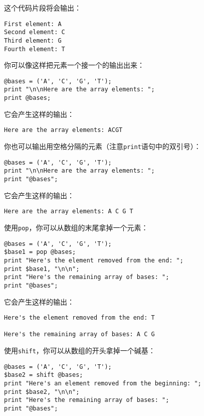 这个代码片段将会输出：

\begin{lstlisting}
First element: A
Second element: C
Third element: G
Fourth element: T
\end{lstlisting}

你可以像这样把元素一个接一个的输出出来：

\begin{lstlisting}
@bases = ('A', 'C', 'G', 'T');
print "\n\nHere are the array elements: ";
print @bases;
\end{lstlisting}

它会产生这样的输出：

\begin{lstlisting}
Here are the array elements: ACGT
\end{lstlisting}

你也可以输出用空格分隔的元素（注意\verb|print|语句中的双引号）：

\begin{lstlisting}
@bases = ('A', 'C', 'G', 'T');
print "\n\nHere are the array elements: ";
print "@bases";
\end{lstlisting}

它会产生这样的输出：

\begin{lstlisting}
Here are the array elements: A C G T
\end{lstlisting}

使用\verb|pop|，你可以从数组的末尾拿掉一个元素：

\begin{lstlisting}
@bases = ('A', 'C', 'G', 'T');
$base1 = pop @bases;
print "Here's the element removed from the end: ";
print $base1, "\n\n";
print "Here's the remaining array of bases: ";
print "@bases";
\end{lstlisting}

它会产生这样的输出：

\begin{lstlisting}
Here's the element removed from the end: T

Here's the remaining array of bases: A C G
\end{lstlisting}

使用\verb|shift|，你可以从数组的开头拿掉一个碱基：

\begin{lstlisting}
@bases = ('A', 'C', 'G', 'T');
$base2 = shift @bases;
print "Here's an element removed from the beginning: ";
print $base2, "\n\n";
print "Here's the remaining array of bases: ";
print "@bases";
\end{lstlisting}

